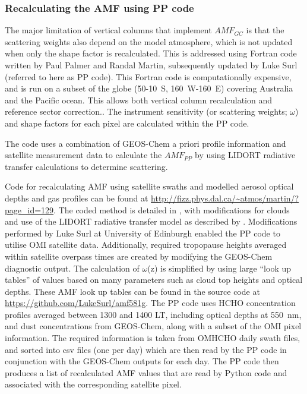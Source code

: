     \subsubsection{Recalculating the AMF using PP code}
      \label{Model:omiRecalc:ppcode}
      
      
      The major limitation of vertical columns that implement $AMF_{GC}$ is that the scattering weights also depend on the model atmosphere, which is not updated when only the shape factor is recalculated.
      This is addressed using Fortran code written by Paul Palmer and Randal Martin, subsequently updated by Luke Surl (referred to here as PP code).
      This Fortran code is computationally expensive, and is run on a subset of the globe (50-10\degr~S, 160\degr~W-160\degr~E) covering Australia and the Pacific ocean.
      This allows both vertical column recalculation and reference sector correction..
      The instrument sensitivity (or scattering weights; $\omega$) and shape factors for each pixel are calculated within the PP code.
      
      The code uses a combination of GEOS-Chem a priori profile information and satellite measurement data to calculate the $AMF_{PP}$ by using LIDORT radiative transfer calculations to determine scattering.
      
      
      Code for recalculating AMF using satellite swaths and modelled aerosol optical depths and gas profiles can be found at \url{http://fizz.phys.dal.ca/~atmos/martin/?page_id=129}. 
      The coded method is detailed in \textcite{Palmer2001}, with modifications for clouds and use of the LIDORT radiative transfer model \parencite{Spurr2002} as described by \textcite{Martin2003}.
      Modifications performed by Luke Surl at University of Edinburgh enabled the PP code to utilise OMI satellite data.
      Additionally, required tropopause heights averaged within satellite overpass times are created by modifying the GEOS-Chem diagnostic output.
      The calculation of $\omega$(z) is simplified by using large ``look up tables'' of values based on many parameters such as cloud top heights and optical depths.
      These AMF look up tables can be found in the source code at \url{https://github.com/LukeSurl/amf581g}.
      The PP code uses HCHO concentration profiles averaged between 1300 and 1400 LT, including optical depths at 550~nm, and dust concentrations from GEOS-Chem, along with a subset of the OMI pixel information.
      The required information is taken from OMHCHO daily swath files, and sorted into csv files (one per day) which are then read by the PP code in conjunction with the GEOS-Chem outputs for each day.
      The PP code then produces a list of recalculated AMF values that are read by Python code and associated with the corresponding satellite pixel.
    
